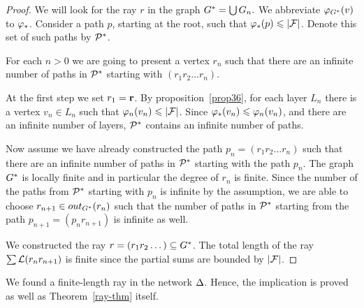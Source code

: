 \documentclass[12pt,oneside,a4paper]{amsart}
\begin{document}
          \begin{proof}
            We will look for the ray $r$ in the graph $\gstar = \bigcup G_n.$
            We abbreviate $\phi_{\gstar}(v)$ to $\phistar$.
            Consider a path $p$, starting at the root, such that $\phistar(p) \leq \lvert\flowpos\rvert$.
            Denote this set of such paths by $\cal{P}^*$.

            For each $n > 0$ we are going to present a vertex $r_n$ such that there are an infinite number of paths
              in $\cal{P}^*$ starting with $(r_1 r_2 \dots r_n)$.

            At the first step we set $r_1 = \root$.
            By proposition~\ref{prop36}, for each layer $L_n$ there is a vertex $v_n \in L_n$ such that
              $\phi_n(v_n) \leq \lvert\flowpos\rvert$.
            Since $\phistar(v_n) \leq \phi_n(v_n)$, and there are an infinite number of layers,
              $\cal{P}^*$ contains an infinite number of paths.

            Now assume we have already constructed the path $p_n = (r_1 r_2\dots r_n)$ such that
              there are an infinite number of paths in $\cal{P}^*$ starting with the path $p_n$.
            The graph $\gstar$ is locally finite and in particular the degree of $r_n$ is finite.
            Since the number of the paths from $\cal{P}^*$ starting with $p_n$ is infinite by the assumption,
              we are able to choose $r_{n+1} \in \eout_{G^*}(r_n)$ such that the number of paths in $\cal{P}^*$ starting from the path $p_{n+1}= (p_n r_{n + 1})$ is infinite as well.

            We constructed the ray $r = (r_1 r_2 \dots) \subseteq \gstar$.
            The total length of the ray $\sum \len(r_n r_{n+1})$ is finite
              since the partial sums are bounded by $\lvert \flowpos \rvert$.
          \end{proof}
          We found a finite-length ray in the network $\net$.
          Hence, the implication is proved as well as Theorem~\ref{ray-thm} itself.

      \medskip
\end{document}
